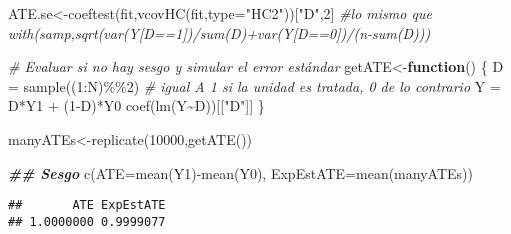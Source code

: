 \documentclass[
]{article}
\newenvironment{Shaded}{\begin{snugshade}}{\end{snugshade}}
\newcommand{\AttributeTok}[1]{\textcolor[rgb]{0.77,0.63,0.00}{#1}}
\newcommand{\CommentTok}[1]{\textcolor[rgb]{0.56,0.35,0.01}{\textit{#1}}}
\newcommand{\ControlFlowTok}[1]{\textcolor[rgb]{0.13,0.29,0.53}{\textbf{#1}}}
\newcommand{\DecValTok}[1]{\textcolor[rgb]{0.00,0.00,0.81}{#1}}
\newcommand{\DocumentationTok}[1]{\textcolor[rgb]{0.56,0.35,0.01}{\textbf{\textit{#1}}}}
\newcommand{\FunctionTok}[1]{\textcolor[rgb]{0.00,0.00,0.00}{#1}}
\newcommand{\NormalTok}[1]{#1}
\newcommand{\OtherTok}[1]{\textcolor[rgb]{0.56,0.35,0.01}{#1}}
\newcommand{\SpecialCharTok}[1]{\textcolor[rgb]{0.00,0.00,0.00}{#1}}
\newcommand{\StringTok}[1]{\textcolor[rgb]{0.31,0.60,0.02}{#1}}
\begin{document}
\begin{Shaded}
\begin{Highlighting}[]
\NormalTok{ATE.se}\OtherTok{\textless{}{-}}\FunctionTok{coeftest}\NormalTok{(fit,}\FunctionTok{vcovHC}\NormalTok{(fit,}\AttributeTok{type=}\StringTok{"HC2"}\NormalTok{))[}\StringTok{"D"}\NormalTok{,}\DecValTok{2}\NormalTok{] }
 \CommentTok{\#lo mismo que with(samp,sqrt(var(Y[D==1])/sum(D)+var(Y[D==0])/(n{-}sum(D))) }

\CommentTok{\# Evaluar si no hay sesgo y simular el error estándar}
\NormalTok{getATE}\OtherTok{\textless{}{-}}\ControlFlowTok{function}\NormalTok{() \{}
\NormalTok{  D }\OtherTok{=} \FunctionTok{sample}\NormalTok{((}\DecValTok{1}\SpecialCharTok{:}\NormalTok{N)}\SpecialCharTok{\%\%}\DecValTok{2}\NormalTok{) }\CommentTok{\#  igual A 1 si la unidad es tratada, 0 de lo contrario}
\NormalTok{  Y }\OtherTok{=}\NormalTok{ D}\SpecialCharTok{*}\NormalTok{Y1 }\SpecialCharTok{+}\NormalTok{ (}\DecValTok{1}\SpecialCharTok{{-}}\NormalTok{D)}\SpecialCharTok{*}\NormalTok{Y0 }
  \FunctionTok{coef}\NormalTok{(}\FunctionTok{lm}\NormalTok{(Y}\SpecialCharTok{\textasciitilde{}}\NormalTok{D))[[}\StringTok{"D"}\NormalTok{]] }
\NormalTok{\} }

\NormalTok{manyATEs}\OtherTok{\textless{}{-}}\FunctionTok{replicate}\NormalTok{(}\DecValTok{10000}\NormalTok{,}\FunctionTok{getATE}\NormalTok{()) }

\DocumentationTok{\#\# Sesgo}
\FunctionTok{c}\NormalTok{(}\AttributeTok{ATE=}\FunctionTok{mean}\NormalTok{(Y1)}\SpecialCharTok{{-}}\FunctionTok{mean}\NormalTok{(Y0), }\AttributeTok{ExpEstATE=}\FunctionTok{mean}\NormalTok{(manyATEs)) }
\end{Highlighting}
\end{Shaded}

\begin{verbatim}
##       ATE ExpEstATE 
## 1.0000000 0.9999077
\end{verbatim}
\end{document}
